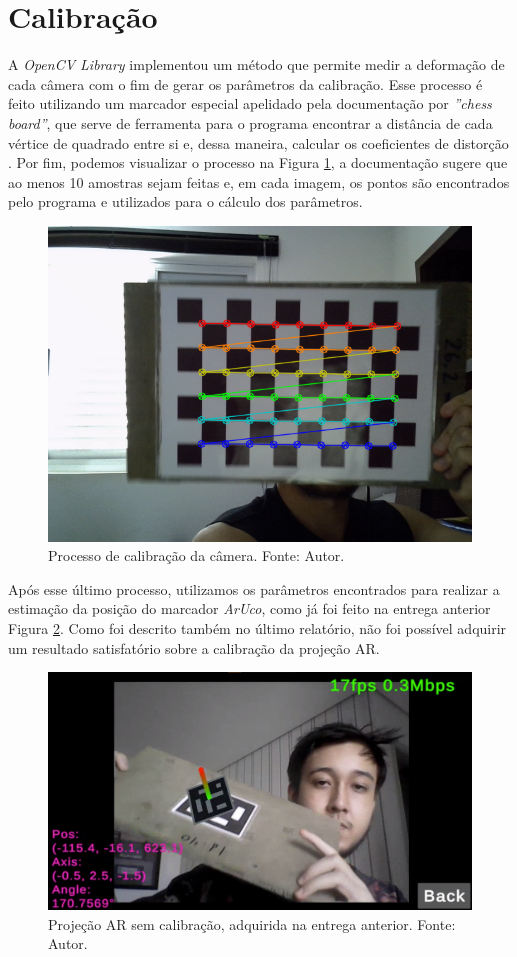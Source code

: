 \section{Calibração}

A \textit{OpenCV Library} implementou um método que permite medir a deformação de cada câmera com o fim de gerar os parâmetros da calibração. Esse processo é feito utilizando um marcador especial apelidado pela documentação por \textit{''chess board''}, que serve de ferramenta para o programa encontrar a distância de cada vértice de quadrado entre si e, dessa maneira, calcular os coeficientes de distorção \cite{opencv-calib}. Por fim, podemos visualizar o processo na Figura \ref{fig:chessb}, a documentação sugere que ao menos 10 amostras sejam feitas e, em cada imagem, os pontos são encontrados pelo programa e utilizados para o cálculo dos parâmetros.

\begin{figure}[ht]
    \centering
    \includegraphics[width=.4\linewidth]{figuras/chessboard.png}
    \caption{Processo de calibração da câmera. Fonte: Autor.}
    \label{fig:chessb}
\end{figure}

Após esse último processo, utilizamos os parâmetros encontrados para realizar a estimação da posição do marcador \textit{ArUco}, como já foi feito na entrega anterior Figura \ref{fig:error-calib}. Como foi descrito também no último relatório, não foi possível adquirir um resultado satisfatório sobre a calibração da projeção AR. 

\begin{figure}[ht]
    \centering
    \includegraphics[width=.4\linewidth]{figuras/vcranium_calibration.png}
    \caption{Projeção AR sem calibração, adquirida na entrega anterior. Fonte: Autor.}
    \label{fig:error-calib}
\end{figure}

